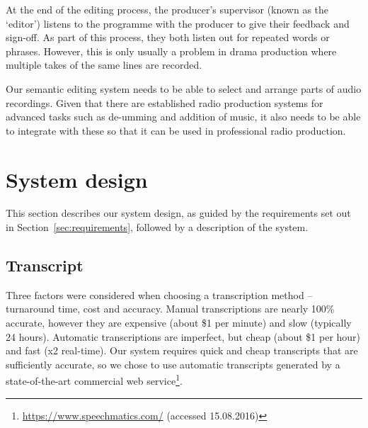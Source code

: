 At the end of the editing process, the producer's supervisor (known as the
`editor') listens to the programme with the producer to give their feedback and
sign-off. As part of this process, they both listen out for repeated words or
phrases. However, this is only usually a problem in drama production where
multiple takes of the same lines are recorded.

Our semantic editing system needs to be able to select and arrange parts of
audio recordings. Given that there are established radio production
systems for advanced tasks such as de-umming and addition of music, it also
needs to be able to integrate with these so that it can be used in 
professional radio production.


%
%
%
%
%
%

\section{System design}
This section describes our system design, as guided by the requirements set out
in Section~\ref{sec:requirements}, followed by a description of the system.

\subsection{Transcript}
Three factors were considered when choosing a transcription method --
turnaround time, cost and accuracy. Manual transcriptions are nearly 100\%
accurate, however they are expensive (about \$1 per minute) and slow (typically
24 hours). Automatic transcriptions are imperfect, but cheap (about \$1 per
hour) and fast (x2 real-time). Our system requires quick and cheap transcripts
that are sufficiently accurate, so we chose to use automatic transcripts
generated by a state-of-the-art commercial web
service\footnote{\url{https://www.speechmatics.com/} (accessed 15.08.2016)}.

